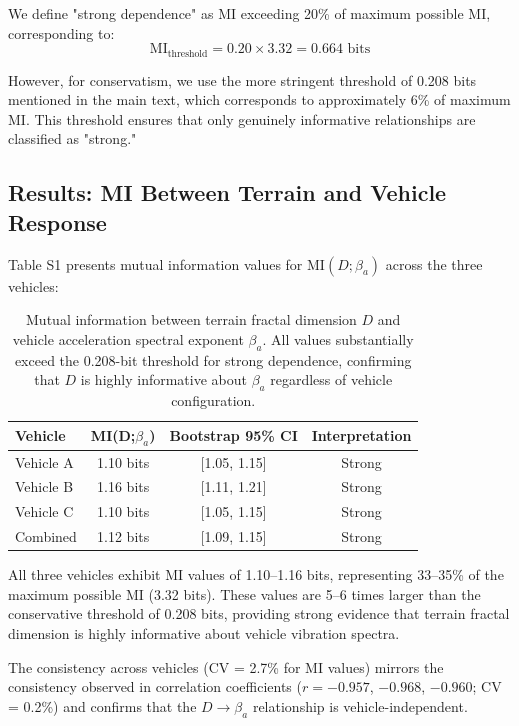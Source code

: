 \documentclass[11pt,letterpaper]{article}
\begin{document}
We define "strong dependence" as MI exceeding 20\% of maximum possible MI, corresponding to:
\begin{equation}
\text{MI}_{\text{threshold}} = 0.20 \times 3.32 = 0.664 \text{ bits}
\end{equation}

However, for conservatism, we use the more stringent threshold of 0.208 bits mentioned in the main text, which corresponds to approximately 6\% of maximum MI. This threshold ensures that only genuinely informative relationships are classified as "strong."

\subsection{Results: MI Between Terrain and Vehicle Response}

Table S1 presents mutual information values for $\text{MI}(D;\beta_a)$ across the three vehicles:

\begin{table}[h]
\centering
\begin{tabular}{lccc}
\hline
\textbf{Vehicle} & \textbf{MI(D;$\beta_a$)} & \textbf{Bootstrap 95\% CI} & \textbf{Interpretation} \\
\hline
Vehicle A & 1.10 bits & [1.05, 1.15] & Strong \\
Vehicle B & 1.16 bits & [1.11, 1.21] & Strong \\
Vehicle C & 1.10 bits & [1.05, 1.15] & Strong \\
\hline
Combined & 1.12 bits & [1.09, 1.15] & Strong \\
\hline
\end{tabular}
\caption{Mutual information between terrain fractal dimension $D$ and vehicle acceleration spectral exponent $\beta_a$. All values substantially exceed the 0.208-bit threshold for strong dependence, confirming that $D$ is highly informative about $\beta_a$ regardless of vehicle configuration.}
\end{table}

All three vehicles exhibit MI values of 1.10--1.16 bits, representing 33--35\% of the maximum possible MI (3.32 bits). These values are 5--6 times larger than the conservative threshold of 0.208 bits, providing strong evidence that terrain fractal dimension is highly informative about vehicle vibration spectra.

The consistency across vehicles (CV = 2.7\% for MI values) mirrors the consistency observed in correlation coefficients ($r = -0.957$, $-0.968$, $-0.960$; CV = 0.2\%) and confirms that the $D \rightarrow \beta_a$ relationship is vehicle-independent.
\end{document}
